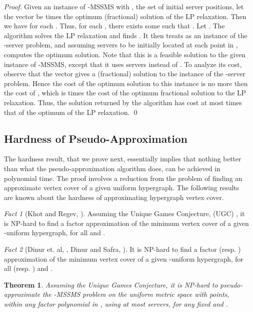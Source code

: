 \documentclass[11pt]{article}
\theoremstyle{plain}\newtheorem{theorem}{Theorem}
\theoremstyle{definition}
\theoremstyle{remark}
\newtheorem{fact}{Fact}
\begin{document}
\begin{proof}
Given an instance of -MSSMS with , the set of initial server positions, let 
the vector  be  times the optimum (fractional) solution of the LP relaxation. Then we have  for each .
Thus, for each , there exists some  such that . Let . The algorithm solves the LP relaxation and finds . It then treats  as an instance of the -server problem, and assuming  servers to be initially located at each point in , computes the optimum solution. Note that this is a feasible solution to the given instance of -MSSMS, except that it uses  servers instead of . To analyze its cost, observe that the vector  gives a (fractional) solution to the instance  of the -server problem. Hence the cost of the optimum solution to this instance is no more then the cost of , which is  times the cost of the optimum fractional solution to the LP relaxation. 
Thus, the solution returned by the algorithm 
has cost at most  times that of the optimum of the LP relaxation. \qed
\end{proof}

\subsection{Hardness of Pseudo-Approximation}

The hardness result, that we prove next, essentially implies that nothing better than what the pseudo-approximation algorithm does, can be achieved in polynomial time. The proof involves a reduction from the problem of finding an approximate vertex cover of a given uniform hypergraph. The following results are known about the hardness of approximating hypergraph vertex cover.

\begin{fact}[Khot and Regev, \cite{KhotR08}]\label{fact_hard1}
Assuming the Unique Games Conjecture, (UGC) \cite{Khot_STOC02_UGC}, it is NP-hard to find a factor  approximation of the minimum vertex cover of a given -uniform hypergraph, for all  and .
\end{fact}

\begin{fact}[Dinur et. al, \cite{DinurGKR05_VC_hardness}, Dinur and Safra, \cite{DinurS_STOC02_VC_hardness}]\label{fact_hard2}
It is NP-hard to find a factor  (resp. ) approximation of the minimum vertex cover of a given -uniform hypergraph, for all  (resp. ) and .
\end{fact}

\begin{theorem}\label{thm_hardness}
Assuming the Unique Games Conjecture, it is NP-hard to pseudo-approximate the -MSSMS problem on the uniform metric space with  points, within any factor polynomial in , using at most  servers, for any fixed  and .
\end{theorem}
\end{document}
